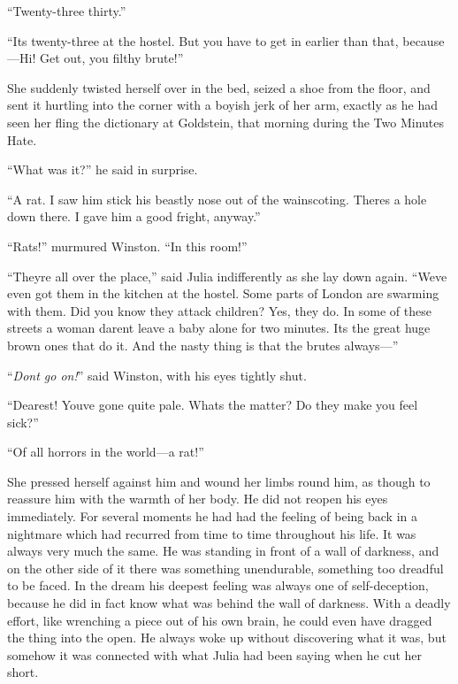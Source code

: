 ``Twenty-three thirty.''

``It\textquotesingle s twenty-three at the hostel. But you have to get in
earlier than that, because---Hi! Get out, you filthy brute!''

She suddenly twisted herself over in the bed, seized a shoe from the
floor, and sent it hurtling into the corner with a boyish jerk of her
arm, exactly as he had seen her fling the dictionary at Goldstein, that
morning during the Two Minutes Hate.

``What was it?'' he said in surprise.

``A rat. I saw him stick his beastly nose out of the wainscoting.
There\textquotesingle s a hole down there. I gave him a good fright,
anyway.''

``Rats!'' murmured Winston. ``In this room!''

``They\textquotesingle re all over the place,'' said Julia indifferently
as she lay down again. ``We\textquotesingle ve even got them in the
kitchen at the hostel. Some parts of London are swarming with them. Did
you know they attack children? Yes, they do. In some of these streets a
woman daren\textquotesingle t leave a baby alone for two minutes.
It\textquotesingle s the great huge brown ones that do it. And the nasty
thing is that the brutes always---''

``\emph{Don\textquotesingle t go on!}'' said Winston, with his eyes
tightly shut.

``Dearest! You\textquotesingle ve gone quite pale. What\textquotesingle s
the matter? Do they make you feel sick?''

``Of all horrors in the world---a rat!''

She pressed herself against him and wound her limbs round him, as though
to reassure him with the warmth of her body. He did not reopen his eyes
immediately. For several moments he had had the feeling of being back in
a nightmare which had recurred from time to time throughout his life. It
was always very much the same. He was standing in front of a wall of
darkness, and on the other side of it there was something unendurable,
something too dreadful to be faced. In the dream his deepest feeling was
always one of self-deception, because he did in fact know what was
behind the wall of darkness. With a deadly effort, like wrenching a
piece out of his own brain, he could even have dragged the thing into
the open. He always woke up without discovering what it was, but somehow
it was connected with what Julia had been saying when he cut her short.

